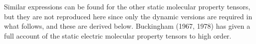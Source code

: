 \documentclass[%
class = book,%
crop = false,%
float = true,%
multi = true,%
preview = false,%
]{standalone}
\begin{document}
Similar expressions can be found for the other static molecular property tensors, but they are not reproduced here since only the dynamic versions are required in what follows, and these are derived below. Buckingham (1967, 1978) has given a full account of the static electric molecular property tensors to high order.

\onlyifstandalone{\printbibliography}
\end{document}
